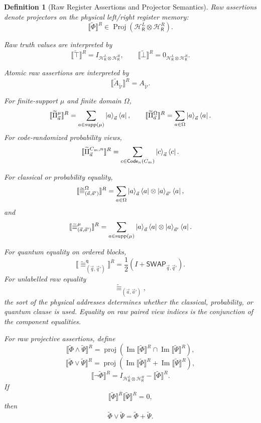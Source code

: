 \documentclass[acmsmall,screen,review,anonymous,nonacm]{acmart}
\newtheorem{definition}{Definition}[section]
\theoremstyle{defn_style}
\begin{document}
\begin{definition}[Raw Register Assertions and Projector Semantics]
Raw assertions denote projectors on the physical left/right register memory:
\[
\llbracket \widetilde{\Phi}\rrbracket^R
\in
\operatorname{Proj}
\left(
\mathcal H^L_{\mathsf R}\otimes\mathcal H^R_{\mathsf R}
\right).
\]

Raw truth values are interpreted by
\[
\llbracket\widetilde{\top}\rrbracket^R
=
I_{\mathcal H^L_{\mathsf R}\otimes\mathcal H^R_{\mathsf R}},
\qquad
\llbracket\widetilde{\bot}\rrbracket^R
=
0_{\mathcal H^L_{\mathsf R}\otimes\mathcal H^R_{\mathsf R}}.
\]

Atomic raw assertions are interpreted by
\[
\llbracket \widetilde A_{\widetilde{\mathcal V}}\rrbracket^R
=
A_{\widetilde{\mathcal V}}.
\]

For finite-support \(\mu\) and finite domain \(\Omega\),
\[
\llbracket \widetilde{\Pi}_{\vec a}^{\mu}\rrbracket^R
=
\sum_{a\in\operatorname{supp}(\mu)}
\ket a_{\vec a}\bra a,
\qquad
\llbracket \widetilde{\Pi}_{\vec a}^{\Omega}\rrbracket^R
=
\sum_{a\in\Omega}
\ket a_{\vec a}\bra a.
\]
For code-randomized probability views,
\[
\llbracket \widetilde{\Pi}_{\vec a}^{C_m,n}\rrbracket^R
=
\sum_{c\in\mathsf{Code}_n(C_m)}
\ket c_{\vec a}\bra c .
\]

For classical or probability equality,
\[
\llbracket
\widetilde{\equiv}_{(\vec a,\vec a')}^{\Omega}
\rrbracket^R
=
\sum_{a\in\Omega}
\ket a_{\vec a}\bra a
\otimes
\ket a_{\vec a'}\bra a,
\]
and
\[
\llbracket
\widetilde{\equiv}_{(\vec a,\vec a')}^{\mu}
\rrbracket^R
=
\sum_{a\in\operatorname{supp}(\mu)}
\ket a_{\vec a}\bra a
\otimes
\ket a_{\vec a'}\bra a.
\]

For quantum equality on ordered blocks,
\[
\llbracket
\widetilde{\equiv}^{\mathsf q}_{(\vec q,\vec q')}
\rrbracket^R
=
\frac12
\left(
I+\mathsf{SWAP}_{\vec q,\vec q'}
\right).
\]
For unlabelled raw equality
\[
\widetilde{\equiv}_{(\vec a,\vec a')},
\]
the sort of the physical addresses determines whether the classical,
probability, or quantum clause is used.  Equality on raw paired view indices is
the conjunction of the component equalities.

For raw projective assertions, define
\[
\llbracket \widetilde{\Phi}\land\widetilde{\Psi}\rrbracket^R
=
\operatorname{proj}
\left(
\operatorname{Im}\llbracket \widetilde{\Phi}\rrbracket^R
\cap
\operatorname{Im}\llbracket \widetilde{\Psi}\rrbracket^R
\right),
\]
\[
\llbracket \widetilde{\Phi}\lor\widetilde{\Psi}\rrbracket^R
=
\operatorname{proj}
\left(
\operatorname{Im}\llbracket \widetilde{\Phi}\rrbracket^R
+
\operatorname{Im}\llbracket \widetilde{\Psi}\rrbracket^R
\right),
\]
\[
\llbracket \neg\widetilde{\Phi}\rrbracket^R
=
I_{\mathcal H^L_{\mathsf R}\otimes\mathcal H^R_{\mathsf R}}
-
\llbracket \widetilde{\Phi}\rrbracket^R .
\]
If
\[
\llbracket\widetilde{\Phi}\rrbracket^R
\llbracket\widetilde{\Psi}\rrbracket^R
=
0,
\]
then
\[
\widetilde{\Phi}\lor\widetilde{\Psi}
=
\widetilde{\Phi}+\widetilde{\Psi}.
\]


\end{definition}
\end{document}
